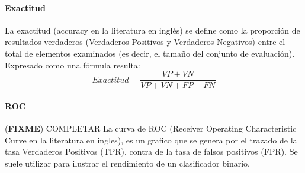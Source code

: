 \documentclass[a4paper,11pt,spanish]{book}
\newcommand*{\FIXME}[1]{{(\textbf{FIXME}) {#1}}}
\begin{document}
	  \paragraph { Exactitud }
	    La exactitud (accuracy en la literatura en inglés) se define como la proporción de resultados verdaderos (Verdaderos Positivos y Verdaderos Negativos) entre el total
	    de elementos examinados (es decir, el tamaño del conjunto de evaluación). Expresado como una fórmula resulta:\\
	    \begin{equation}
	      Exactitud = {\frac {VP+VN}{VP+VN+FP+FN}}
	    \end{equation}

	  \paragraph {ROC}
	    \FIXME{COMPLETAR}
	    La curva de ROC (Receiver Operating Characteristic Curve en la literatura en ingles), es un grafico que se genera por el trazado de la tasa Verdaderos Positivos (TPR),
	    contra de la tasa de falsos positivos (FPR). Se suele utilizar para ilustrar el rendimiento de un clasificador binario.
\end{document}
